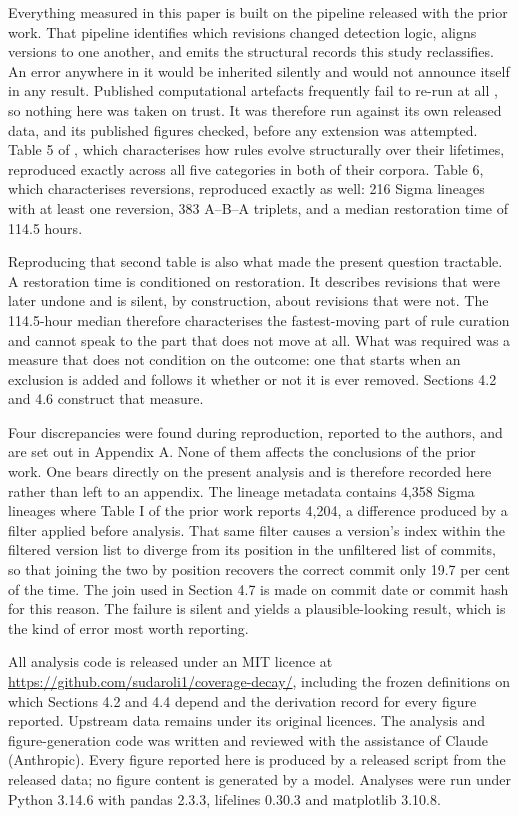 Everything measured in this paper is built on the pipeline released with the prior work. That pipeline identifies which revisions changed detection logic, aligns versions to one another, and emits the structural records this study reclassifies. An error anywhere in it would be inherited silently and would not announce itself in any result. Published computational artefacts frequently fail to re-run at all \citep{collberg2016}, so nothing here was taken on trust. It was therefore run against its own released data, and its published figures checked, before any extension was attempted. Table 5 of \citet{long2026}, which characterises how rules evolve structurally over their lifetimes, reproduced exactly across all five categories in both of their corpora. Table 6, which characterises reversions, reproduced exactly as well: 216 Sigma lineages with at least one reversion, 383 A--B--A triplets, and a median restoration time of 114.5 hours.

Reproducing that second table is also what made the present question tractable. A restoration time is conditioned on restoration. It describes revisions that were later undone and is silent, by construction, about revisions that were not. The 114.5-hour median therefore characterises the fastest-moving part of rule curation and cannot speak to the part that does not move at all. What was required was a measure that does not condition on the outcome: one that starts when an exclusion is added and follows it whether or not it is ever removed. Sections 4.2 and 4.6 construct that measure.

Four discrepancies were found during reproduction, reported to the authors, and are set out in Appendix A. None of them affects the conclusions of the prior work. One bears directly on the present analysis and is therefore recorded here rather than left to an appendix. The lineage metadata contains 4,358 Sigma lineages where Table I of the prior work reports 4,204, a difference produced by a filter applied before analysis. That same filter causes a version's index within the filtered version list to diverge from its position in the unfiltered list of commits, so that joining the two by position recovers the correct commit only 19.7 per cent of the time. The join used in Section 4.7 is made on commit date or commit hash for this reason. The failure is silent and yields a plausible-looking result, which is the kind of error most worth reporting.

All analysis code is released under an MIT licence at \url{https://github.com/sudaroli1/coverage-decay/}, including the frozen definitions on which Sections 4.2 and 4.4 depend and the derivation record for every figure reported. Upstream data remains under its original licences. The analysis and figure-generation code was written and reviewed with the assistance of Claude (Anthropic). Every figure reported here is produced by a released script from the released data; no figure content is generated by a model. Analyses were run under Python 3.14.6 with pandas 2.3.3, lifelines 0.30.3 and matplotlib 3.10.8.

